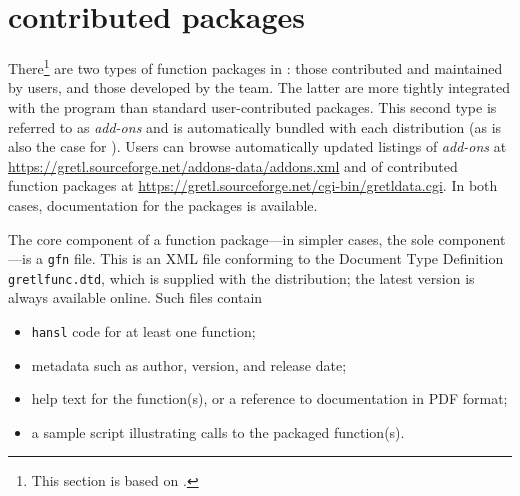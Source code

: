 \section{\gretl contributed packages}\label{sec:gretl_contributed_packages}
There\footnote{This section is based on \cite{gretl_function_package_guide}.}
are two types of function packages in \gretl: those
contributed and maintained by users, and those developed by
the \gretl team. The latter are more tightly integrated with
the \gretl program than standard user-contributed packages.
This second type is referred to as \textit{add-ons} and is
automatically bundled with each \gretl distribution
(as is also the case for \gretlpy). Users can browse
automatically updated listings of \gretl \textit{add-ons}
at \url{https://gretl.sourceforge.net/addons-data/addons.xml}
and of contributed function packages at
\url{https://gretl.sourceforge.net/cgi-bin/gretldata.cgi}.
In both cases, documentation for the packages is available.

The core component of a \gretl function package---in simpler
cases, the sole component---is a \texttt{gfn} file. This is an
XML file conforming to the Document Type Definition
\texttt{gretlfunc.dtd}, which is supplied with the \gretl
distribution; the latest version is always available online.
Such files contain
\begin{itemize}
	\item \texttt{hansl} \cite[see][]{gretl_hansl} code for at least one function;
	\item metadata such as author, version, and release date;
	\item help text for the function(s), or a reference to
		documentation in PDF format;
	\item a sample script illustrating calls to the packaged function(s).
\end{itemize}

